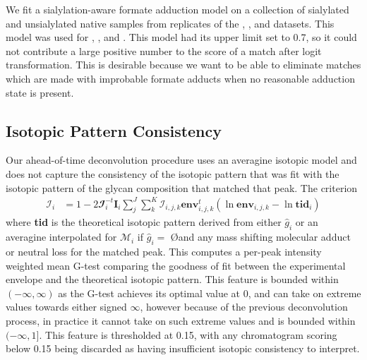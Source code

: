         We fit a sialylation-aware formate adduction model on a collection of sialylated and unsialylated
        native \nglycan samples from replicates of the \agp, \igg, and \phil datasets. This model was used
        for \agp, \igg, \phil and \philbs. This model had its upper limit set to 0.7, so it could not contribute
        a large positive number to the score of a match after logit transformation. This is desirable because
        we want to be able to eliminate matches which are made with improbable formate adducts when no
        reasonable adduction state is present.

    \subsection{Isotopic Pattern Consistency}
        Our ahead-of-time deconvolution procedure uses an averagine isotopic model and does not
        capture the consistency of the isotopic pattern that was fit with the isotopic pattern
        of the glycan composition that matched that peak. The criterion
        \begin{align}
            \mathscr{I}_i &= 1 - 2\mathbfcal{I}_i^{-t}\mathbf{I}_i\sum_j^J{
                \sum_k^K{\mathcal{I}_{i, j, k}
                    \textbf{env}_{i, j, k}^t\left(
                        \ln{\textbf{env}}_{i, j, k} -
                        \ln{\textbf{tid}_{i}}
                    \right)
                }
            }
        \end{align}
        where \textbf{tid} is the theoretical isotopic pattern derived from either ${\hat g}_i$
        or an averagine interpolated for $\mathcal{M}_i$ if ${\hat g}_i =$ \O and any mass shifting molecular
        adduct or neutral loss for the matched peak. This computes a per-peak intensity weighted mean
        G-test comparing the goodness of fit between the experimental envelope and the theoretical
        isotopic pattern. This feature is bounded within $(-\infty, \infty)$ as the G-test achieves
        its optimal value at 0, and can take on extreme values towards either signed $\infty$, however
        because of the previous deconvolution process, in practice it cannot take on such extreme
        values and is bounded within $(-\infty, 1]$. This feature is thresholded at 0.15, with any
        chromatogram scoring below 0.15 being discarded as having insufficient isotopic consistency
        to interpret.

